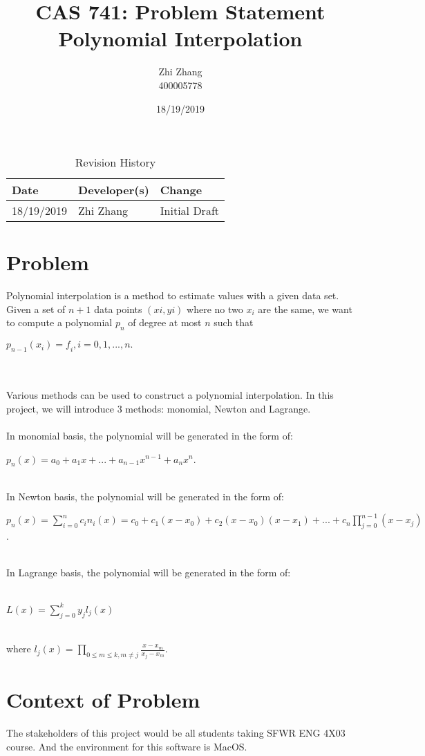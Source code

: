 \documentclass{article}
\title{CAS 741: Problem Statement\\Polynomial Interpolation}
\author{Zhi Zhang\\400005778}
\date{18/19/2019}
\begin{document}
\maketitle
\begin{table}[hp]
\caption{Revision History} \label{TblRevisionHistory}
\begin{tabularx}{\textwidth}{llX}
\toprule
\textbf{Date} & \textbf{Developer(s)} & \textbf{Change}\\
\midrule
18/19/2019 & Zhi Zhang & Initial Draft\\
\bottomrule
\end{tabularx}
\end{table}

\section{Problem}

Polynomial interpolation is a method to estimate values with a given data set. Given a set of $\mathit{n+1}$ data points $\mathit{(xi, yi)}$ where no two $\mathit{x_{i}}$ are the same, we want to compute a polynomial $\mathit{p_{n}}$ of degree at most $\mathit{n}$ such that 
\\\centerline{$\mathit{p_{n-1}(x_{i})=f_{i}, i  = 0,1, ...,n.}$}\\
\\Various methods can be used to construct a polynomial interpolation. In this project, we will introduce 3 methods: monomial, Newton and Lagrange.
\\
\\ In monomial basis, the polynomial will be generated in the form of: 
\\\centerline{$\mathit{p_{n}(x)=a_{0}+a_{1}x+...+a_{n-1}x^{n-1}+a_{n}x^{n}}$.}
\\In Newton basis, the polynomial will be generated in the form of:
\\\centerline{$\mathit{p_{n}(x)=\displaystyle \sum_{i=0}^{n} c_{i}n_{i}(x)=c_{0}+c_{1}(x-x_{0})+c_{2}(x-x_{0})(x-x_{1})+...+c_{n}\displaystyle \prod_{j=0}^{n-1} (x-x_{j})}$.} 
\\In Lagrange basis, the polynomial will be generated in the form of:\\
\\\centerline{$\mathit{L(x)= \sum_{j=0}^{k} y_{j}l_{j}(x)}$}\\ 
where $\mathit{l_{j}(x) = \displaystyle \prod_{0\leq m\leq k,m\neq j} \frac{x-x_{m}}{x_{j}-x_{m}}}$.

\section{Context of Problem}
The stakeholders of this project would be all students taking SFWR ENG 4X03 course. And the environment for this software is MacOS.
 
\end{document}
